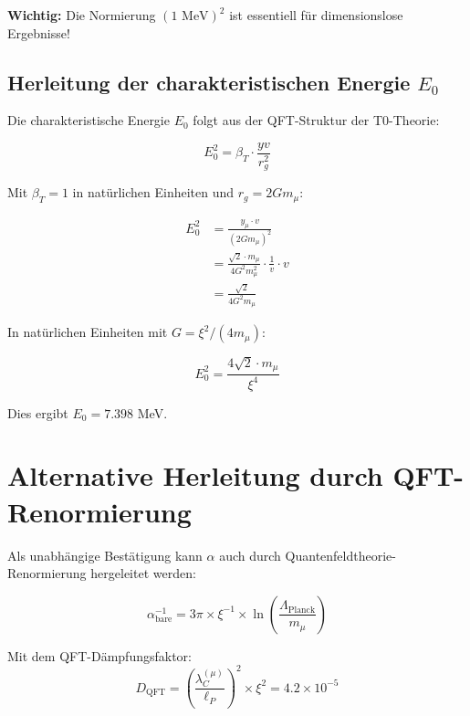\documentclass[12pt,a4paper]{article}
\begin{document}
	\begin{important}
		\textbf{Wichtig:} Die Normierung $(1 \text{ MeV})^2$ ist essentiell für dimensionslose Ergebnisse!
	\end{important}
	
	\subsection{Herleitung der charakteristischen Energie $E_0$}
	
	Die charakteristische Energie $E_0$ folgt aus der QFT-Struktur der T0-Theorie:
	
	\begin{equation}
		E_0^2 = \beta_T \cdot \frac{yv}{r_g^2}
	\end{equation}
	
	Mit $\beta_T = 1$ in natürlichen Einheiten und $r_g = 2Gm_\mu$:
	
	\begin{align}
		E_0^2 &= \frac{y_\mu \cdot v}{(2Gm_\mu)^2}\\
		&= \frac{\sqrt{2} \cdot m_\mu}{4G^2 m_\mu^2} \cdot \frac{1}{v} \cdot v\\
		&= \frac{\sqrt{2}}{4G^2 m_\mu}
	\end{align}
	
	In natürlichen Einheiten mit $G = \xi^2/(4m_\mu)$:
	
	\begin{equation}
		E_0^2 = \frac{4\sqrt{2} \cdot m_\mu}{\xi^4}
	\end{equation}
	
	Dies ergibt $E_0 = 7.398$ MeV.
	
	\section{Alternative Herleitung durch QFT-Renormierung}
	
	Als unabhängige Bestätigung kann $\alpha$ auch durch Quantenfeldtheorie-Renormierung hergeleitet werden:
	
	\begin{equation}
		\alpha_{\text{bare}}^{-1} = 3\pi \times \xi^{-1} \times \ln\left(\frac{\Lambda_{\text{Planck}}}{m_\mu}\right)
	\end{equation}
	
	Mit dem QFT-Dämpfungsfaktor:
	\begin{equation}
		D_{\text{QFT}} = \left(\frac{\lambda_C^{(\mu)}}{\ell_P}\right)^{2} \times \xi^2 = 4.2 \times 10^{-5}
	\end{equation}
	
\end{document}
